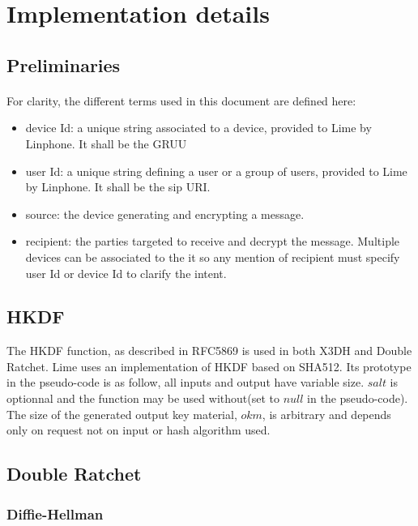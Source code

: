 \documentclass[a4paper,11pt]{article}
\begin{document}
\newpage
\section{Implementation details}
  \subsection{Preliminaries}
    \paragraph{}For clarity, the different terms used in this document are defined here:
    \begin{itemize}
      \item device Id: a unique string associated to a device, provided to Lime by Linphone. It shall be the GRUU\cite{rfc5627}
      \item user Id: a unique string defining a user or a group of users, provided to Lime by Linphone. It shall be the sip URI.
      \item source: the device generating and encrypting a message.
      \item recipient: the parties targeted to receive and decrypt the message. Multiple devices can be associated to the it so any mention of recipient must specify user Id or device Id to clarify the intent.
    \end{itemize}

  \subsection{HKDF}
      The HKDF function, as described in RFC5869 \cite{rfc5869} is used in both X3DH and Double Ratchet. Lime uses an implementation of HKDF based on SHA512. Its prototype in the pseudo-code is as follow, all inputs and output have variable size. $salt$ is optionnal and the function may be used without(set to $null$ in the pseudo-code). The size of the generated output key material, $okm$, is arbitrary and depends only on request not on input or hash algorithm used.
      \begin{algorithmic}
        \Statex
          \State {}
        \EndFunction
      \end{algorithmic}
  \subsection{Double Ratchet}
    \subsubsection{Diffie-Hellman}
\end{document}
